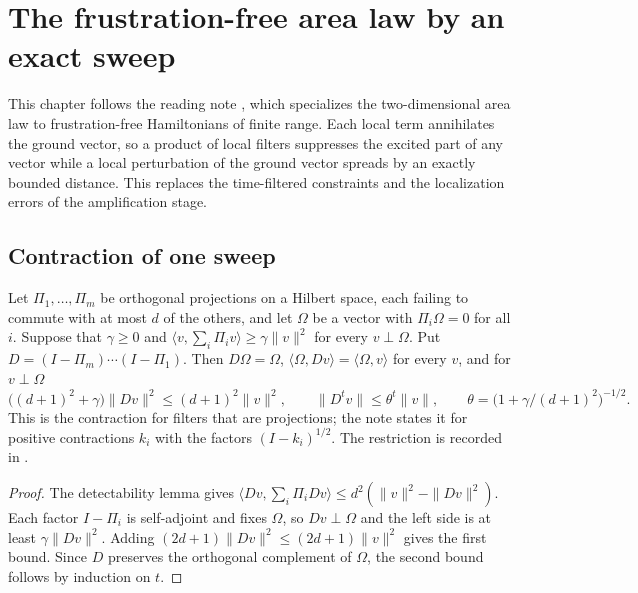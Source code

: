 \chapter{The frustration-free area law by an exact sweep}
\label{ch:peps_area_law_frustration_free}

This chapter follows the reading note \cite{TNLean2026FrustrationFreeNote}, which
specializes the two-dimensional area law \cite[Theorem~1.1]{OpenAI2026AreaLaw}
to frustration-free Hamiltonians of finite range. Each local term annihilates
the ground vector, so a product of local filters suppresses the excited part of
any vector while a local perturbation of the ground vector spreads by an exactly
bounded distance. This replaces the time-filtered constraints and the
localization errors of the amplification stage.

\section{Contraction of one sweep}
\label{sec:frustration_free_area_law_sweep}

\begin{lemma}
    \label{thm:frustration_free_area_law_sweep_contraction}
    \leanok
    Let $\Pi_1,\dots,\Pi_m$ be orthogonal projections on a Hilbert space, each
    failing to commute with at most $d$ of the others, and let $\Omega$ be a
    vector with $\Pi_i\Omega=0$ for all $i$. Suppose that $\gamma\ge0$ and
    $\langle v,\sum_i\Pi_iv\rangle\ge\gamma\|v\|^2$ for every $v\perp\Omega$.
    Put $D=(I-\Pi_m)\cdots(I-\Pi_1)$. Then $D\Omega=\Omega$,
    $\langle\Omega,Dv\rangle=\langle\Omega,v\rangle$ for every $v$, and for
    $v\perp\Omega$
    \[
        \bigl((d+1)^2+\gamma\bigr)\|Dv\|^2\le(d+1)^2\|v\|^2,\qquad
        \|D^tv\|\le\theta^t\|v\|,\qquad
        \theta=\bigl(1+\gamma/(d+1)^2\bigr)^{-1/2}.
    \]
    This is the contraction \cite[eq.~(sweep)]{TNLean2026FrustrationFreeNote}
    for filters that are projections; the note states it for positive
    contractions $k_i$ with the factors $(I-k_i)^{1/2}$. The restriction is
    recorded in \cite{gap:oai26_frustrationfree_sweep_range_projections}.
\end{lemma}

\begin{proof}\leanok
    The detectability lemma \cite{AnshuAradVidick2016} gives
    $\langle Dv,\sum_i\Pi_iDv\rangle\le d^2(\|v\|^2-\|Dv\|^2)$. Each factor
    $I-\Pi_i$ is self-adjoint and fixes $\Omega$, so $Dv\perp\Omega$ and the
    left side is at least $\gamma\|Dv\|^2$. Adding $(2d+1)\|Dv\|^2\le(2d+1)\|v\|^2$
    gives the first bound. Since $D$ preserves the orthogonal complement of
    $\Omega$, the second bound follows by induction on $t$.
\end{proof}

